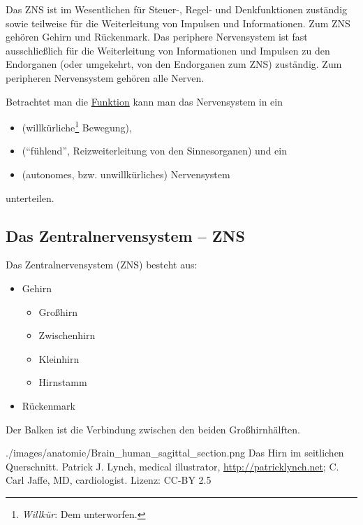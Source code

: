 Das ZNS ist im Wesentlichen für Steuer-, Regel- und Denkfunktionen
zuständig sowie teilweise für die Weiterleitung von Impulsen und
Informationen. Zum ZNS gehören Gehirn und Rückenmark. Das periphere Nervensystem
ist fast ausschließlich für die Weiterleitung von Informationen und
Impulsen zu den Endorganen (oder umgekehrt, von den Endorganen zum ZNS)
zuständig. Zum peripheren Nervensystem gehören alle Nerven.

Betrachtet man die \underline{Funktion} kann man das
Nervensystem in ein

\begin{itemize}
\item {} (willkürliche\footnote{\emph{Willkür}: Dem  unterworfen.} Bewegung),
\item {} ("`fühlend"', Reizweiterleitung von
den Sinnesorganen) und ein
\item {} (autonomes, bzw. unwillkürliches)
Nervensystem
\end{itemize}

unterteilen. 

\subsection{Das Zentralnervensystem -- ZNS}
\label{topic:zns}
\gTagNo{}

{
Das Zentralnervensystem (ZNS) besteht aus:

\begin{itemize}
    \item Gehirn
    \begin{itemize}
        \item Großhirn
        \item Zwischenhirn
        \item Kleinhirn
        \item Hirnstamm
    \end{itemize}
    \item Rückenmark
\end{itemize}

Der Balken ist die Verbindung zwischen den beiden Großhirnhälften.

}{}
{./images/anatomie/Brain_human_sagittal_section.png}
{Das Hirn im seitlichen Querschnitt.}
{Patrick J. Lynch, medical illustrator,
\url{http://patricklynch.net}; C. Carl Jaffe, MD,
cardiologist. Lizenz: CC-BY 2.5}


